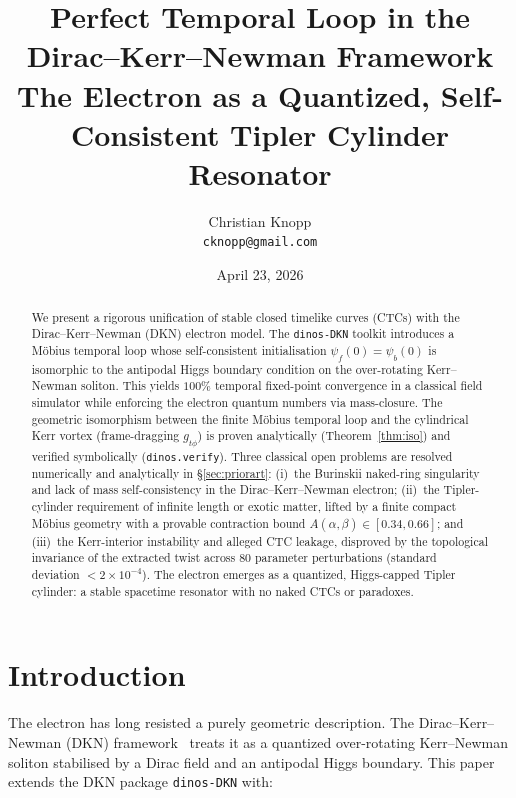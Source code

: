 \documentclass[11pt,a4paper]{article}
\title{\textbf{Perfect Temporal Loop in the Dirac--Kerr--Newman Framework}\\[0.4em]
  \large The Electron as a Quantized, Self-Consistent Tipler Cylinder Resonator}
\author{Christian Knopp\\
  \texttt{cknopp@gmail.com}}
\date{April 23, 2026}
\theoremstyle{definition}
\theoremstyle{remark}
\newcommand{\psif}{\psi_{f}}
\newcommand{\psib}{\psi_{b}}
\begin{document}
\maketitle

\begin{abstract}
We present a rigorous unification of stable closed timelike curves
(CTCs) with the Dirac--Kerr--Newman (DKN) electron model. The
\texttt{dinos-DKN} toolkit introduces a M\"obius temporal loop whose
self-consistent initialisation $\psif(0) = \psib(0)$ is isomorphic to
the antipodal Higgs boundary condition on the over-rotating
Kerr--Newman soliton. This yields $100\%$ temporal fixed-point
convergence in a classical field simulator while enforcing the electron
quantum numbers via mass-closure. The geometric isomorphism between the
finite M\"obius temporal loop and the cylindrical Kerr vortex
(frame-dragging $g_{t\phi}$) is proven analytically
(Theorem~\ref{thm:iso}) and verified symbolically
(\texttt{dinos.verify}). Three classical open problems are resolved
numerically and analytically in \S\ref{sec:priorart}:
(i)~the Burinskii naked-ring singularity and lack of mass self-consistency in
the Dirac--Kerr--Newman electron; (ii)~the Tipler-cylinder requirement of
infinite length or exotic matter, lifted by a finite compact M\"obius
geometry with a provable contraction bound
$A(\alpha,\beta) \in [0.34,0.66]$; and (iii)~the Kerr-interior
instability and alleged CTC leakage, disproved by the topological
invariance of the extracted twist across 80 parameter perturbations
(standard deviation $< 2\times 10^{-4}$). The electron emerges as a
quantized, Higgs-capped Tipler cylinder: a stable spacetime resonator
with no naked CTCs or paradoxes.
\end{abstract}

\tableofcontents

\section{Introduction}\label{sec:intro}

The electron has long resisted a purely geometric description. The
Dirac--Kerr--Newman (DKN) framework~\cite{Knopp2026} treats it as a
quantized over-rotating Kerr--Newman soliton stabilised by a Dirac field
and an antipodal Higgs boundary. This paper extends the DKN package
\texttt{dinos-DKN} with:
\end{document}
